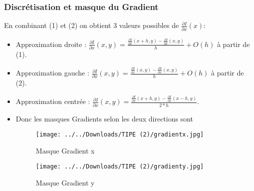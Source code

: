 \documentclass{beamer}
\newcommand{\divp}[2]
	{
	  \frac{\partial #1}{\partial #2}
	}
\begin{document}
\begin{frame}
\frametitle{Discrétisation et masque du Gradient}
En combinant (1) et (2) on obtient 3 valeurs possibles de $\divp{I}{x}(x)$:

\begin{itemize}

\item Approximation droite : $\divp{I}{x}(x,y) = \frac{\divp{I}{x}(x+h,y)-\divp{I}{x}(x,y)}{h} + O(h)$ à partir de (1).

\item Approximation gauche : $\divp{I}{x}(x,y) = \frac{\divp{I}{x}(x,y)-\divp{I}{x}(x,y)}{h} + O(h)$ à partir de (2).

\item Approximation centrée : $\divp{I}{x}(x,y) = \frac{\divp{I}{x}(x+h,y)-
\divp{I}{x}(x-h,y)}{2*h}$.


\item Donc les masques Gradients selon les deux directions sont

\begin{figure}[h]
    \begin{minipage}[c]{.46\linewidth}
        \centering
        \texttt{[image: ../../Downloads/TIPE (2)/gradientx.jpg]}
        \caption{Masque Gradient x}
    \end{minipage}
    \hfill%
    \begin{minipage}[c]{.46\linewidth}
        \centering
        \texttt{[image: ../../Downloads/TIPE (2)/gradienty.jpg]}
        \caption{Masque Gradient y}
    \end{minipage}
\end{figure}

\end{itemize}
\end{frame}
\end{document}
